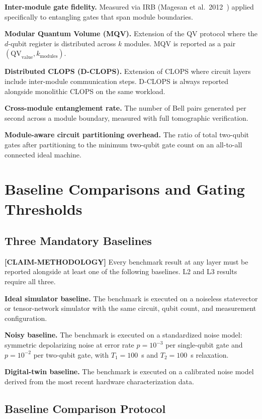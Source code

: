 \documentclass[conference]{IEEEtran}
\begin{document}
\textbf{Inter-module gate fidelity.} Measured via IRB (Magesan et al.\ 2012~\cite{magesan2012}) applied specifically to entangling gates that span module boundaries.

\textbf{Modular Quantum Volume (MQV).} Extension of the QV protocol where the $d$-qubit register is distributed across $k$ modules. MQV is reported as a pair $(\mathrm{QV}_\mathrm{value}, k_\mathrm{modules})$.

\textbf{Distributed CLOPS (D-CLOPS).} Extension of CLOPS where circuit layers include inter-module communication steps. D-CLOPS is always reported alongside monolithic CLOPS on the same workload.

\textbf{Cross-module entanglement rate.} The number of Bell pairs generated per second across a module boundary, measured with full tomographic verification.

\textbf{Module-aware circuit partitioning overhead.} The ratio of total two-qubit gates after partitioning to the minimum two-qubit gate count on an all-to-all connected ideal machine.

\section{Baseline Comparisons and Gating Thresholds}

\subsection{Three Mandatory Baselines}

\textbf{[CLAIM-METHODOLOGY]} Every benchmark result at any layer must be reported alongside at least one of the following baselines. L2 and L3 results require all three.

\textbf{Ideal simulator baseline.} The benchmark is executed on a noiseless statevector or tensor-network simulator with the same circuit, qubit count, and measurement configuration.

\textbf{Noisy baseline.} The benchmark is executed on a standardized noise model: symmetric depolarizing noise at error rate $p = 10^{-3}$ per single-qubit gate and $p = 10^{-2}$ per two-qubit gate, with $T_1 = 100$~\textmu s and $T_2 = 100$~\textmu s relaxation.

\textbf{Digital-twin baseline.} The benchmark is executed on a calibrated noise model derived from the most recent hardware characterization data.

\subsection{Baseline Comparison Protocol}
\end{document}
